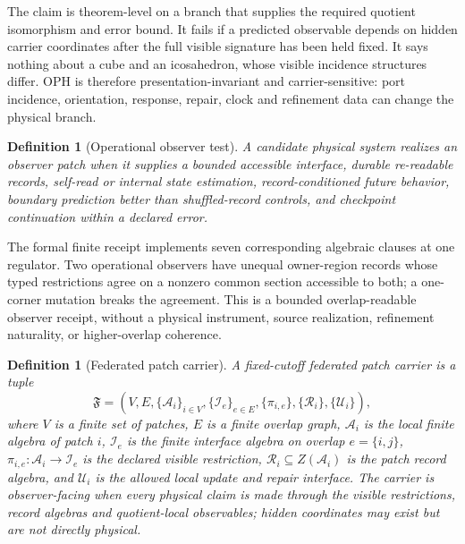 \documentclass[11pt]{article}
\newtheorem{definition}[theorem]{Definition}
\theoremstyle{remark}
\theoremstyle{plain}
\begin{document}
The claim is theorem-level on a branch that supplies the required quotient
isomorphism and error bound. It fails if a predicted observable depends on
hidden carrier coordinates after the full visible signature has been held
fixed. It says nothing about a cube and an icosahedron, whose visible
incidence structures differ. OPH is therefore presentation-invariant and
carrier-sensitive: port incidence, orientation, response, repair, clock and
refinement data can change the physical branch.

\begin{definition}[Operational observer test]\label{def:operational-observer-test}
A candidate physical system realizes an observer patch when it supplies a bounded accessible
interface, durable re-readable records, self-read or internal state estimation, record-conditioned
future behavior, boundary prediction better than shuffled-record controls, and checkpoint
continuation within a declared error.
\end{definition}

The formal finite receipt implements seven corresponding algebraic clauses at
one regulator. Two operational observers have unequal owner-region records
whose typed restrictions agree on a nonzero common section accessible to both;
a one-corner mutation breaks the agreement. This is a bounded
overlap-readable observer receipt, without a physical instrument, source
realization, refinement naturality, or higher-overlap coherence.

\begin{definition}[Federated patch carrier]
\label{def:federated-patch-carrier}
A fixed-cutoff federated patch carrier is a tuple
\[
\mathfrak F=(V,E,\{\mathcal A_i\}_{i\in V},\{\mathcal I_e\}_{e\in E},
\{\pi_{i,e}\},\{\mathcal R_i\},\{\mathcal U_i\}),
\]
where \(V\) is a finite set of patches, \(E\) is a finite overlap graph,
\(\mathcal A_i\) is the local finite algebra of patch \(i\), \(\mathcal I_e\) is the finite
interface algebra on overlap \(e=\{i,j\}\), \(\pi_{i,e}:\mathcal A_i\to\mathcal I_e\) is the
declared visible restriction, \(\mathcal R_i\subseteq Z(\mathcal A_i)\) is the patch record
algebra, and \(\mathcal U_i\) is the allowed local update and repair interface.
The carrier is observer-facing when every physical claim is made through the
visible restrictions, record algebras and quotient-local observables; hidden
coordinates may exist but are not directly physical.
\end{definition}
\end{document}
